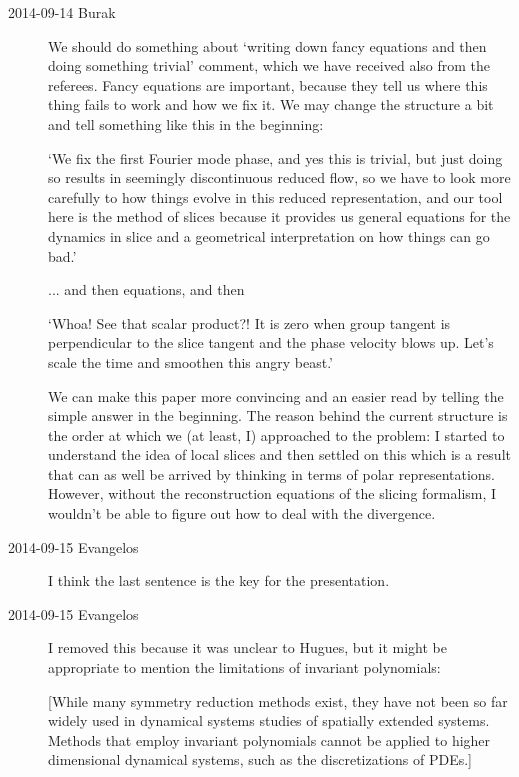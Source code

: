 \begin{description}
\item[2014-09-14 Burak] We should do something about `writing down fancy
equations and then doing something trivial' comment, which we have received
also from the referees. Fancy equations are important, because they tell
us where this thing fails to work and how we fix it. We may change the
structure a bit and tell something like this in the beginning:

`We fix the first Fourier mode phase, and yes this is trivial, but just doing
so results in seemingly discontinuous reduced flow, so we have to look more
carefully to how things evolve in this reduced  representation, and our tool
here is the method of slices because it provides us general equations for the
dynamics in slice and a geometrical interpretation on how things can go bad.'

... and then equations, and then

`Whoa! See that scalar product?! It is zero when group tangent is perpendicular
to the slice tangent and the phase velocity blows up. Let's scale the time and
smoothen this angry beast.'

We can make this paper more convincing and an easier read by telling the
simple answer in the beginning. The reason behind the current structure is
the order at which we (at least, I) approached to the problem: I started to
understand the idea of local slices and then settled on this which is a result
that can as well be arrived by thinking in terms of polar representations.
However, without the reconstruction equations of the slicing formalism, I
wouldn't be able to figure out how to deal with the divergence.

\item[2014-09-15 Evangelos] I think the last sentence is the key for the presentation.

\item[2014-09-15 Evangelos] I removed this because it was unclear to Hugues, but it might
be appropriate to mention the limitations of invariant polynomials:

[While many symmetry reduction methods exist, they have not been so far widely used in dynamical
systems studies of spatially extended systems. Methods
that employ invariant polynomials
cannot be applied to higher dimensional dynamical systems,
such as the discretizations of PDEs.]


\end{description}
